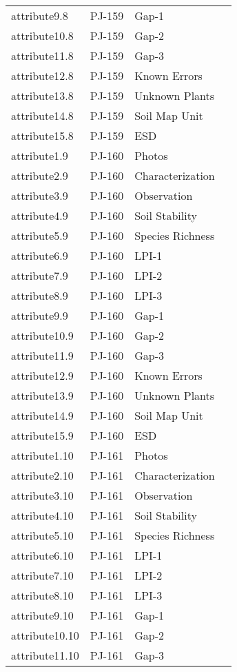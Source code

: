 \documentclass[
]{article}
\begin{document}
\begin{longtable}[]{@{}llll@{}}
attribute9.8 & PJ-159 & Gap-1 & \\
attribute10.8 & PJ-159 & Gap-2 & \\
attribute11.8 & PJ-159 & Gap-3 & \\
attribute12.8 & PJ-159 & Known Errors & \\
attribute13.8 & PJ-159 & Unknown Plants & \\
attribute14.8 & PJ-159 & Soil Map Unit & \\
attribute15.8 & PJ-159 & ESD & \\
attribute1.9 & PJ-160 & Photos & \\
attribute2.9 & PJ-160 & Characterization & \\
attribute3.9 & PJ-160 & Observation & \\
attribute4.9 & PJ-160 & Soil Stability & \\
attribute5.9 & PJ-160 & Species Richness & \\
attribute6.9 & PJ-160 & LPI-1 & \\
attribute7.9 & PJ-160 & LPI-2 & \\
attribute8.9 & PJ-160 & LPI-3 & \\
attribute9.9 & PJ-160 & Gap-1 & \\
attribute10.9 & PJ-160 & Gap-2 & \\
attribute11.9 & PJ-160 & Gap-3 & \\
attribute12.9 & PJ-160 & Known Errors & \\
attribute13.9 & PJ-160 & Unknown Plants & \\
attribute14.9 & PJ-160 & Soil Map Unit & \\
attribute15.9 & PJ-160 & ESD & \\
attribute1.10 & PJ-161 & Photos & \\
attribute2.10 & PJ-161 & Characterization & \\
attribute3.10 & PJ-161 & Observation & \\
attribute4.10 & PJ-161 & Soil Stability & \\
attribute5.10 & PJ-161 & Species Richness & \\
attribute6.10 & PJ-161 & LPI-1 & \\
attribute7.10 & PJ-161 & LPI-2 & \\
attribute8.10 & PJ-161 & LPI-3 & \\
attribute9.10 & PJ-161 & Gap-1 & \\
attribute10.10 & PJ-161 & Gap-2 & \\
attribute11.10 & PJ-161 & Gap-3 & \\

\end{longtable}
\end{document}
